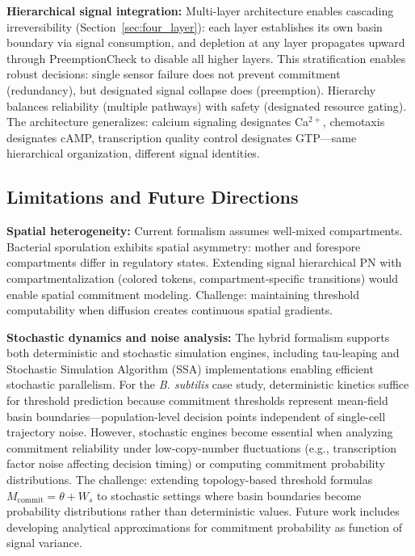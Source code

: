 \documentclass[10pt,letterpaper]{article}
\begin{document}
\textbf{Hierarchical signal integration:} Multi-layer architecture enables cascading irreversibility (Section~\ref{sec:four_layer}): each layer establishes its own basin boundary via signal consumption, and depletion at any layer propagates upward through PreemptionCheck to disable all higher layers. This stratification enables robust decisions: single sensor failure does not prevent commitment (redundancy), but designated signal collapse does (preemption). Hierarchy balances reliability (multiple pathways) with safety (designated resource gating). The architecture generalizes: calcium signaling designates Ca$^{2+}$, chemotaxis designates cAMP, transcription quality control designates GTP---same hierarchical organization, different signal identities.

\subsection{Limitations and Future Directions}

\textbf{Spatial heterogeneity:} Current formalism assumes well-mixed compartments. Bacterial sporulation exhibits spatial asymmetry: mother and forespore compartments differ in regulatory states. Extending signal hierarchical PN with compartmentalization (colored tokens, compartment-specific transitions) would enable spatial commitment modeling. Challenge: maintaining threshold computability when diffusion creates continuous spatial gradients.

\textbf{Stochastic dynamics and noise analysis:} The hybrid formalism supports both deterministic and stochastic simulation engines, including tau-leaping and Stochastic Simulation Algorithm (SSA) implementations enabling efficient stochastic parallelism. For the \textit{B. subtilis} case study, deterministic kinetics suffice for threshold prediction because commitment thresholds represent mean-field basin boundaries---population-level decision points independent of single-cell trajectory noise. However, stochastic engines become essential when analyzing commitment reliability under low-copy-number fluctuations (e.g., transcription factor noise affecting decision timing) or computing commitment probability distributions. The challenge: extending topology-based threshold formulas $M_{\text{commit}} = \theta + W_s$ to stochastic settings where basin boundaries become probability distributions rather than deterministic values. Future work includes developing analytical approximations for commitment probability as function of signal variance.
\end{document}
